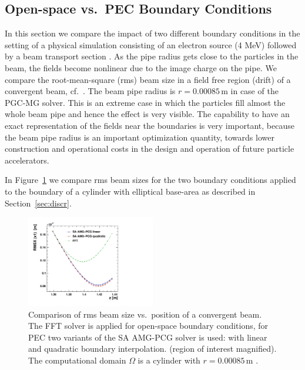\subsection{Open-space vs.\ PEC Boundary Conditions} 
\label{sec:physrun}

In this section we compare the impact of two different boundary
conditions in the setting of a physical simulation consisting of an
electron source (4 MeV) followed by a beam transport section
\cite{schiet:08}.  As the pipe radius gets close to the particles in the
beam, the fields become nonlinear due to the image charge on the pipe.
We compare the root-mean-square (rms) beam size in a field free region
(drift) of a convergent beam, cf.~\cite[pp.171ff]{wied:07}.  The
beam pipe radius is $r = 0.00085$\,m in case of the PGC-MG solver.  This
is an extreme case in which the particles fill almost the whole beam
pipe and hence the effect is very visible. 
The capability to have an exact representation of
the fields near the boundaries is very important, because the beam pipe radius is an important optimization quantity,
towards lower construction and operational costs in the design and operation of future particle accelerators. 

In Figure~\ref{fig:vareps} we compare rms beam sizes for the two
boundary conditions applied to the boundary of a cylinder with
elliptical base-area as described in Section~\ref{sec:discr}.


\begin{figure}[ht]
  \begin{center}
    \includegraphics[width=0.5\textwidth]{figures/fft-drift-mg-drift-small-RMSX-x-SPOS}
    \caption{Comparison of rms beam size vs.\ position of a convergent beam. The FFT solver is applied for open-space boundary conditions, for
      PEC two variants of the SA AMG-PCG solver is used: with linear and quadratic boundary interpolation. 
      (region of interest magnified). The
      computational domain $\Omega$ is a cylinder with
      $r=0.00085$\,m \label{fig:vareps}. }
  \end{center} 
\end{figure}

